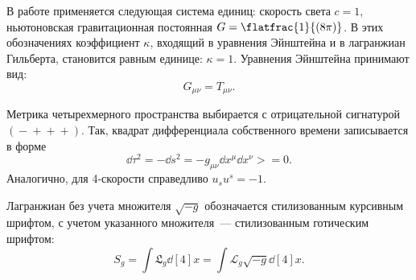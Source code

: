 \documentclass[\docroot/reports/draft/report.tex]{subfiles}
\begin{document}
    В работе применяется следующая система единиц: скорость света $c = 1$, ньютоновская гравитационная постоянная $G = \flatfrac{1}{(8 \pi)}$. В этих обозначениях коэффициент $\kappa$, входящий в уравнения Эйнштейна и в лагранжиан Гильберта, становится равным единице: $\kappa = 1$. Уравнения Эйнштейна принимают вид:
    \begin{equation*}
        G_{\mu\nu} = T_{\mu\nu} .
    \end{equation*}

    Метрика четырехмерного пространства выбирается с отрицательной сигнатурой $(\mathrel{-}\mathrel{+}\mathrel{+}\mathrel{+})$. Так, квадрат дифференциала собственного времени записывается в форме
    \begin{equation*}
        \dd{\tau}^2 = - \dd{s}^2 = - g_{\mu\nu} \dd{x}^\mu \dd{x}^\nu >= 0 .
    \end{equation*}
    Аналогично, для 4-скорости справедливо $u_s u^s = -1$.

    Лагранжиан без учета множителя $\sqrt{-g}$ обозначается стилизованным курсивным шрифтом, с учетом указанного множителя~--- стилизованным готическим шрифтом:
    \begin{equation*}
        S_g = \int \mathfrak{L}_g \dd[4]{x} = \int \mathcal{L}_g \sqrt{-g} \dd[4]{x} .
    \end{equation*}

\end{document}
